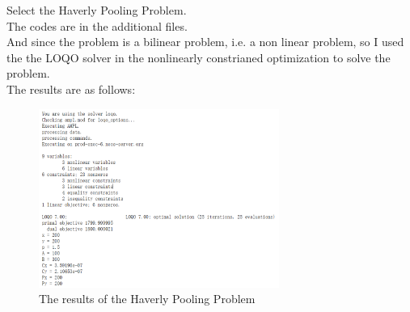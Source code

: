     Select the Haverly Pooling Problem.\\
    The codes are in the additional files.\\
    And since the problem is a bilinear problem, i.e. a non linear problem,
    so I used the the LOQO solver in the nonlinearly constrianed optimization to solve the problem.\\
    The results are as follows:\\

    \begin{figure}[htbp]
        \centering
        \includegraphics[width=0.7\textwidth]{../result/result.png} %
        \caption{The results of the Haverly Pooling Problem}
    \end{figure}
